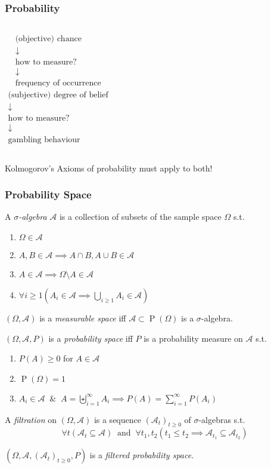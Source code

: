\documentclass[UTF8,11pt,colorlinks,compress,openany]{beamer}%
\begin{document}
\begin{frame}\frametitle{Probability}
\begin{columns}
\begin{gather*}
\text{(objective) chance}\\
\downarrow\\
\text{how to measure?}\\
\downarrow\\
\text{frequency of occurrence}
\end{gather*}
\begin{gather*}
\text{(subjective) degree of belief}\\
\downarrow\\
\text{how to measure?}\\
\downarrow\\
\text{gambling behaviour}
\end{gather*}
\end{columns}
\vspace*{4ex}
\centerline{Kolmogorov's Axioms of probability must apply to both!}
\end{frame}

\begin{frame}\frametitle{Probability Space}
A \emph{$\sigma$-algebra} $\mathcal{A}$ is a collection of subsets of the sample space $\Omega$ s.t.
\begin{enumerate}
	\item $\Omega\in\mathscr{A}$
	\item $A,B\in\mathscr{A}\implies A\cap B, A\cup B\in\mathscr{A}$
	\item $A\in\mathscr{A}\implies \Omega\setminus A\in\mathscr{A}$
	\item $\forall i\geq 1\left(A_i\in\mathscr{A}\implies\bigcup\limits_{i\geq 1}A_i\in\mathscr{A}\right)$
\end{enumerate}
$(\Omega,\mathscr{A})$ is a \emph{measurable space} iff $\mathscr{A}\subset \operatorname{P}(\Omega)$ is a $\sigma$-algebra.

$(\Omega,\mathscr{A},P)$ is a \emph{probability space} iff $P$ is a probability measure on $\mathscr{A}$ s.t.
\begin{enumerate}
	\item $P(A)\geq 0$ for $A\in\mathscr{A}$
	\item $\operatorname{P}(\Omega)=1$
	\item $A_i\in\mathscr{A}\;\;\&\;\; A=\biguplus\limits_{i=1}^\infty A_i \implies P(A)=\sum\limits_{i=1}^\infty P(A_i)$
\end{enumerate}

A \emph{filtration} on $(\Omega,\mathscr{A})$ is a sequence $(\mathscr{A}_t)_{t\geq 0}$ of $\sigma$-algebras s.t. 
\[\forall t\left(\mathscr{A}_{t} \subseteq \mathscr{A}\right)\;\;\text{and}\;\;\forall t_1,t_2\left(t_1\leq t_2 \implies \mathscr{A}_{t_1} \subseteq \mathscr{A}_{t_2}\right)\]

$(\Omega,\mathscr{A},(\mathscr{A}_t)_{t\geq 0},P)$ is a \emph{filtered probability space}.
\end{frame}
\end{document}
